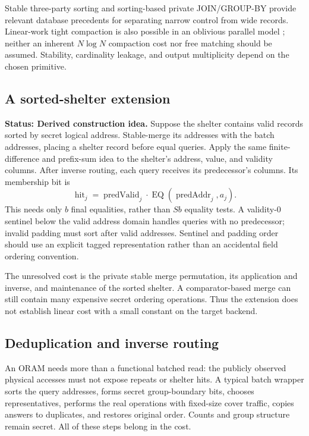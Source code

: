 \documentclass[11pt]{article}
\newcommand{\status}[1]{\textbf{Status: #1.}}
\begin{document}
Stable three-party sorting \cite{sorting2022} and sorting-based private
JOIN/GROUP-BY \cite{joins2024} provide relevant database precedents for separating
narrow control from wide records. Linear-work tight compaction is also possible
in an oblivious parallel model \cite{compaction2020}; neither an inherent
$N\log N$ compaction cost nor free matching should be assumed. Stability,
cardinality leakage, and output multiplicity depend on the chosen primitive.

\subsection{A sorted-shelter extension}\label{sec:sorted-shelter}

\status{Derived construction idea}
Suppose the shelter contains valid records sorted by secret logical address.
Stable-merge its addresses with the batch addresses, placing a shelter record
before equal queries. Apply the same finite-difference and prefix-sum idea to
the shelter's address, value, and validity columns. After inverse routing, each
query receives its predecessor's columns. Its membership bit is
\[
\operatorname{hit}_j=
\operatorname{predValid}_j\cdot
\operatorname{EQ}(\operatorname{predAddr}_j,a_j).
\]
This needs only $b$ final equalities, rather than $Sb$ equality tests. A validity-0
sentinel below the valid address domain handles queries with no predecessor;
invalid padding must sort after valid addresses. Sentinel and padding order
should use an explicit tagged representation rather than an accidental field
ordering convention.

The unresolved cost is the private stable merge permutation, its application
and inverse, and maintenance of the sorted shelter. A comparator-based merge
can still contain many expensive secret ordering operations. Thus the extension
does not establish linear cost with a small constant on the target backend.

\subsection{Deduplication and inverse routing}

An ORAM needs more than a functional batched read: the publicly observed physical
accesses must not expose repeats or shelter hits. A typical batch wrapper sorts
the query addresses, forms secret group-boundary bits, chooses representatives,
performs the real operations with fixed-size cover traffic, copies answers to
duplicates, and restores original order. Counts and group structure remain
secret. All of these steps belong in the cost.
\end{document}
